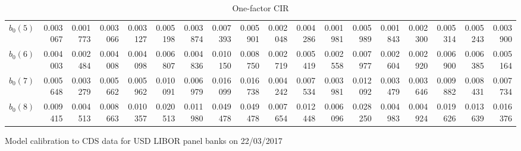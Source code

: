\documentclass[12pt,a4paper]{article}
\theoremstyle{plain}
\numberwithin{equation}{section}
\begin{document}
\begin{table}[t]
\begin{subtable}{.5\textwidth}
{\begin{tabular}{|l|rrrrrrrrrrrrrrrr|r|}
   $\hat{b}_0(5)$   & 0.003067 & 0.001773 & 0.003066 & 0.003127 & 0.005198 & 0.003874 & 0.007393 & 0.005901 & 0.002048 & 0.004286 & 0.001981 & 0.005989 & 0.001843 & 0.002300 & 0.005314 & 0.005243 & 0.003900 \\
     $\hat{b}_0(6)$   & 0.004003 & 0.002484 & 0.004008 & 0.004098 & 0.006807 & 0.004836 & 0.010150 & 0.008750 & 0.002719 & 0.005419 & 0.002558 & 0.007977 & 0.002604 & 0.002920 & 0.006900 & 0.006385 & 0.005164 \\
     $\hat{b}_0(7)$  & 0.005648 & 0.003279 & 0.005662 & 0.005962 & 0.010091 & 0.006979 & 0.016099 & 0.016738 & 0.004242 & 0.007534 & 0.003981 & 0.012092 & 0.003479 & 0.003646 & 0.009882 & 0.008431 & 0.007734 \\
    $\hat{b}_0(8)$   & 0.009415 & 0.004513 & 0.008663 & 0.010357 & 0.020513 & 0.011980 & 0.049478 & 0.049478 & 0.007654 & 0.012448 & 0.006096 & 0.028250 & 0.004983 & 0.004924 & 0.019626 & 0.013639 & 0.016376 \\
    \bottomrule
    \end{tabular}%

    }
  \end{subtable}
 \caption{Model calibration to CDS data for USD LIBOR panel banks on 22/03/2017}\label{CDScoeff1}\vspace*{1ex}

  \begin{subtable}{.5\textwidth}
  \centering
  \caption{One-factor CIR}
  \scalebox{0.40}{

}
\end{subtable}
\end{table}
\end{document}
